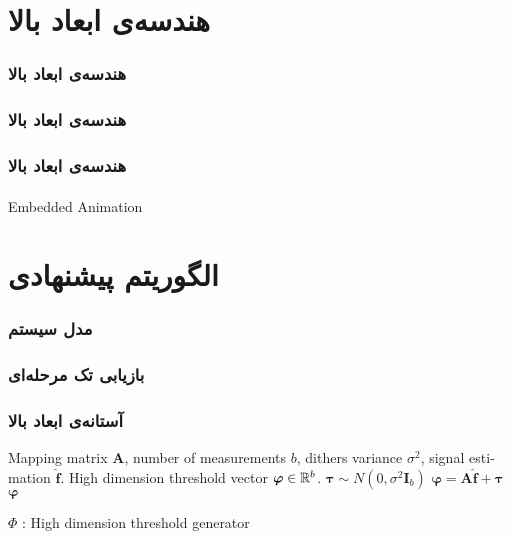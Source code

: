 \section{هندسه‌ی ابعاد بالا\hfill}

\begin{frame}
\frametitle{هندسه‌ی ابعاد بالا}

\end{frame}

\begin{frame}
\frametitle{هندسه‌ی ابعاد بالا}
\framesubtitle{}

\end{frame}

\begin{frame}
\frametitle{هندسه‌ی ابعاد بالا}
\framesubtitle{}
\end{frame}

\begin{frame}{Embedded Animation}
\end{frame}

\section{الگوریتم پیشنهادی\hfill}

\begin{frame}
\frametitle{مدل سیستم}

\begin{figure}
	\centering
	
\end{figure}

\end{frame}

\begin{frame}
\frametitle{بازیابی تک مرحله‌ای}

\end{frame}

\begin{frame}
\frametitle{آستانه‌ی ابعاد بالا}
\begin{latin}
\begin{algorithm}[H]
\begin{algorithmic}[1]
\renewcommand{\algorithmicrequire}{\textbf{Input:}}
\renewcommand{\algorithmicensure}{\textbf{Output:}}
\REQUIRE Mapping matrix $ \bm{A} $, number of measurements $ b $, dithers variance $ \sigma^{2} $, signal estimation $ \hat{\bm{f}} $.
\ENSURE High dimension threshold vector $\bm{\varphi}\in \mathbb{R}^{b}$.
\STATE $ \bm{\tau}\sim N(0,\sigma^{2}\bm{I}_{b} ) $
\STATE  $ \bm{\varphi}=\bm{A}\hat{\bm{f}}+\bm{\tau} $
\RETURN $ \bm{\varphi} $
\end{algorithmic} 
\caption{ $\Phi$ : High dimension threshold generator}
\label{alg:HDTG}
\end{algorithm}
\end{latin}
\end{frame}


